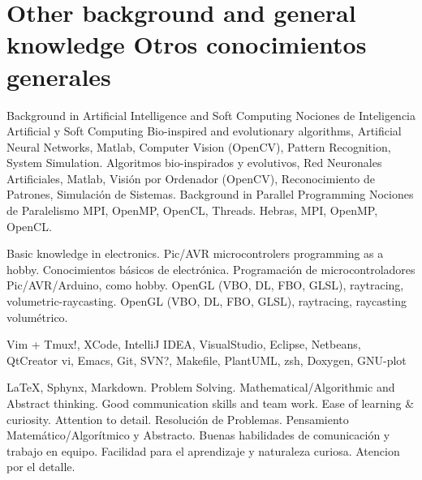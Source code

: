 \section{\ml
    {Other background and general knowledge}
    {Otros conocimientos generales}}

\cvcomputer
    {\ml
    {Background in Artificial Intelligence and Soft Computing}
    {Nociones de Inteligencia Artificial y Soft Computing}}
        {\ml
        {Bio-inspired and evolutionary algorithms, Artificial Neural Networks,
        Matlab, Computer Vision (OpenCV), Pattern Recognition, System
        Simulation.}
        {Algoritmos bio-inspirados y evolutivos, Red Neuronales Artificiales,
        Matlab, Visión por Ordenador (OpenCV), Reconocimiento de Patrones,
        Simulación de Sistemas.}}
    {\ml
    {Background in Parallel Programming}
    {Nociones de Paralelismo}}
        {\ml
        {MPI, OpenMP, OpenCL, Threads.}
        {Hebras, MPI, OpenMP, OpenCL.}}


\cvcomputer
    {}
        {\ml
        {Basic knowledge in electronics. Pic/AVR microcontrolers programming as
        a hobby.}
        {Conocimientos básicos de electrónica. Programación de
        microcontroladores Pic/AVR/Arduino, como hobby.}}
    {}
        {\ml
        {OpenGL (VBO, DL, FBO, GLSL), raytracing, volumetric-raycasting.}
        {OpenGL (VBO, DL, FBO, GLSL), raytracing, raycasting volumétrico.}}


\cvcomputer
    {}
        {Vim + Tmux!, XCode, IntelliJ IDEA, VisualStudio, Eclipse, Netbeans,
        QtCreator}
    {}
        {vi, Emacs, Git, SVN?, Makefile, PlantUML, zsh, Doxygen, GNU-plot}

\cvcomputer
    {}
        {\LaTeX, Sphynx, Markdown.}
    {}
        {\ml
        {Problem Solving. Mathematical/Algorithmic and Abstract thinking. Good
        communication skills and team work. Ease of learning \& curiosity.
        Attention to detail.}
        {Resolución de Problemas. Pensamiento Matemático/Algorítmico y
        Abstracto. Buenas habilidades de comunicación y trabajo en equipo.
        Facilidad para el aprendizaje y naturaleza curiosa. Atencion por el detalle.}}
